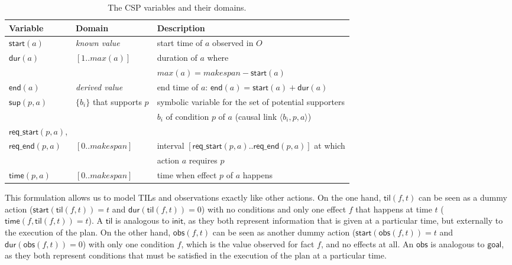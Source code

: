 \documentclass{ecai}
\newcommand{\tup}[1]{{\langle #1 \rangle}}
\newcommand{\dur}{\mathsf{dur}}    %
\newcommand{\obs}{\mathsf{obs}}    %
\newcommand{\start}{\mathsf{start}}%
\newcommand{\en}{\mathsf{end}}     %
\newcommand{\til}{\mathsf{til}}    %
\newcommand{\supp}{\mathsf{sup}}   %
\newcommand{\tim}{\mathsf{time}}   %
\newcommand{\reqs}{\mathsf{req\_{start}}} %
\newcommand{\reqe}{\mathsf{req\_{end}}}   %
\newcommand{\ini}{\mathsf{init}}   %
\newcommand{\goal}{\mathsf{goal}}  %
\begin{document}
\begin{table}
\begin{scriptsize}
\begin{tabular}{lll}
{\bf Variable} & {\bf Domain} & {\bf Description} \\

\hline


$\start(a)$ & \emph{known value} & start time of $a$ observed in $O$ \\
$\dur(a)$ & $[1..max(a)]$ & duration of $a$ where \\
&&$max(a)=makespan-\start(a)$\\
$\en(a)$ & \emph{derived value} & end time of $a$: $\en(a)=\start(a)+\dur(a)$ \\


$\supp(p,a)$ & $\{b_i\}$ that supports $p$ & symbolic variable for the set of potential supporters\\
&& $b_i$ of condition $p$ of $a$ (causal link $\tup{b_i,p,a}$) \\

$\reqs(p,a)$, \\
$\reqe(p,a)$ & $[0..makespan]$ & interval $[\reqs(p,a)..\reqe(p,a)]$ at which \\
&&action $a$ requires $p$ \\

$\tim(p,a)$ & $[0..makespan]$ & time when effect $p$ of $a$ happens \\
\end{tabular}
\end{scriptsize}
\caption{\small The CSP variables and their domains.}
\label{table:variables}
\end{table}

This formulation allows us to model TILs and observations exactly like other actions. On the one hand, $\til(f,t)$ can be seen as a dummy action ($\start(\til(f,t))=t$ and $\dur(\til(f,t))=0$) with no conditions and only one effect $f$ that happens at time $t$ ($\tim(f,\til(f,t))=t$). A $\til$ is analogous to $\ini$, as they both represent information that is given at a particular time, but externally to the execution of the plan. On the other hand, $\obs(f,t)$ can be seen as another dummy action ($\start(\obs(f,t))=t$ and $\dur(\obs(f,t))=0$) with only one condition $f$, which is the value observed for fact $f$, and no effects at all. An $\obs$ is analogous to $\goal$, as they both represent conditions that must be satisfied in the execution of the plan at a particular time.
\end{document}
